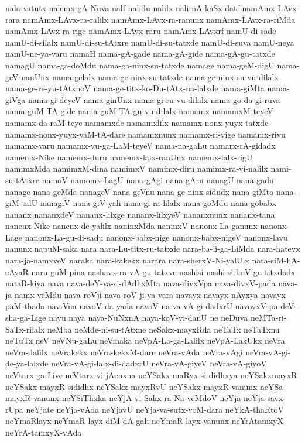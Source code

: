 {nala-vatutx
nalemx-gA-Nuva
nalf
nalidu
nalilx
nali-nA-kaSx-datf
namAmx-LAvx-rara
namAmx-LAvx-ra-ralilx
namAmx-LAvx-ra-ranunx
namAmx-LAvx-ra-riMda
namAmx-LAvx-ra-rige
namAmx-LAvx-raru
namAmx-LAvxrf
namU-di-sade
namU-di-silalx
namU-di-su-tAtxre
namU-di-su-tatxde
namU-di-suva
namU-neya
namU-ne-ya-varu
namaH
nama-gA-gade
nama-gA-gide
nama-gA-gu-tatxde
namagU
nama-ga-doMdu
nama-ga-ninx-su-tatxde
namage
nama-geM-digU
nama-geV-nanUnx
nama-gelalx
nama-ge-ninx-su-tatxde
nama-ge-ninx-su-vu-dilalx
nama-ge-re-yu-tAtxnoV
nama-ge-titx-ko-Du-tAtx-na-lalxde
nama-giMta
nama-giVga
nama-gi-deyeV
nama-ginUnx
nama-gi-ru-vu-dilalx
nama-go-da-gi-ruva
nama-guM-TA-gide
nama-guM-TA-gu-vu-dilalx
namamx
namamxM-teyeV
namamx-da-raM-teye
namamxde
namamxlilx
namamx-nonx-yuyx-tatxde
namamx-nonx-yuyx-vaM-tA-dare
namamxnunx
namamx-ri-vige
namamx-rivu
namamx-varu
namamx-vu-ga-LaM-teyeV
nama-na-gaLu
namarx-rA-gidadx
namemx-Nike
namemx-duru
namemx-lalx-ranUnx
namemx-lalx-rigU
namimxMda
namimxM-dina
namimxV
namimx-diru
namimx-ra-vi-nalilx
nami-su-tAtxre
namoV
namomx-LagU
nana-gAgi
nana-gAru
nanagU
nana-gadu
nanage
nana-geMda
nanageV
nana-geVnu
nana-ge-ninx-sidudx
nana-giMta
nana-giM-talU
nanagiV
nana-giV-yali
nana-gi-ra-lilalx
nana-goMdu
nana-gobabx
nananx
nananxdeV
nananx-lilxge
nananx-lilxyeV
nananxnunx
nananx-tana
nanenx-Nike
nanenx-de-yalilx
naninxMda
naninxV
nanonx-La-ganunx
nanonx-Lage
nanonx-La-gu-di-sadu
nanonx-babx-nige
nanonx-babx-nigeV
nanonx-lavu
nanunx
napuM-saka
nara
nara-Lu-titx-ru-tatxde
nara-ba-li-ga-LiMda
nara-hateyx
nara-ja-namxveV
naraka
nara-kakekx
narara
nara-sherxV-Ni-yalUlx
nara-siM-hA-cAyaR
naru-guM-pina
nashavx-ra-vA-gu-tatxve
nashisi
nashi-si-hoV-gu-titxdadx
nataR-kiya
nava
nava-deY-va-si-dAdhxMta
nava-divxVpa
nava-divxV-pada
nava-ja-namx-veMdu
nava-roVji
nava-roV-ji-ya-vara
navayx
navayx-nAyxya
navayx-paM-thada
naviVna
navoV-da-yada
navoV-na-va-vA-gi-dadxrU
navoyxV-pa-deV-sha-ga-Lige
navu
naya
naya-NuNxnA
naya-koV-vi-danU
ne
neDuva
neMTa-ri-SaTx-rilalx
neMba
neMde-ni-su-tAtxne
neSakx-mayxRda
neTaTx
neTaTxnu
neTuTx
neV
neVNu-gaLu
neVmaka
neVpA-La-ga-Lalilx
neVpA-LakUkx
neVra
neVra-dalilx
neVrakekx
neVra-kekxM-dare
neVra-vAda
neVra-vAgi
neVra-vA-gi-de-ya-lalxde
neVra-vA-gi-lalx-di-dadxrU
neVra-vA-giyeV
neVra-vA-giyoV
neVtarx-ga-Live
neVtarx-vi-jAcnxna
neYSakx-maRyx-si-didhxya
neYSakxmayxR
neYSakx-mayxR-sididhx
neYSakx-mayxRvU
neYSakx-mayxR-vanunx
neYSa-mayxR-vanunx
neYSiThxka
neYjA-vi-Sakx-ra-Na-veMdoV
neYja
neYja-savx-rUpa
neYjate
neYja-vAda
neYjavU
neYja-va-sutx-voM-dara
neYkA-thaRtoV
neYmaRlayx
neYmaR-layx-diM-dA-gali
neYmaR-layx-vanunx
neYrAtamxyX
neYrA-tamxyX-vAda
}

